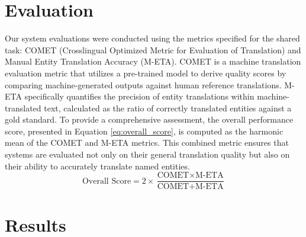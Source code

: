 \documentclass{ecai}
\begin{document}
\section{Evaluation}
\label{sec:experiments}
Our system evaluations were conducted using the metrics specified for the shared task: COMET 
(Crosslingual Optimized Metric for Evaluation of Translation)\cite{rei-etal-2020-comet} and 
Manual Entity Translation Accuracy (M-ETA). 
COMET is a machine translation evaluation metric that utilizes a pre-trained model to derive 
quality scores by comparing machine-generated outputs against human reference translations. 
M-ETA specifically quantifies the precision of entity translations within machine-translated text, 
calculated as the ratio of correctly translated entities against a gold standard.
To provide a comprehensive assessment, the overall performance score, presented in Equation \ref{eq:overall_score}, 
is computed as the harmonic mean of the COMET and M-ETA metrics. This combined metric ensures that systems are 
evaluated not only on their general translation quality but also on their ability to accurately translate named entities.
\begin{equation}
\label{eq:overall_score}
\text{Overall Score} = 2 \times \frac{\text{COMET} \times \text{M-ETA}}{\text{COMET} + \text{M-ETA}}
\end{equation}

\section{Results}
\label{eq:results}
\end{document}
